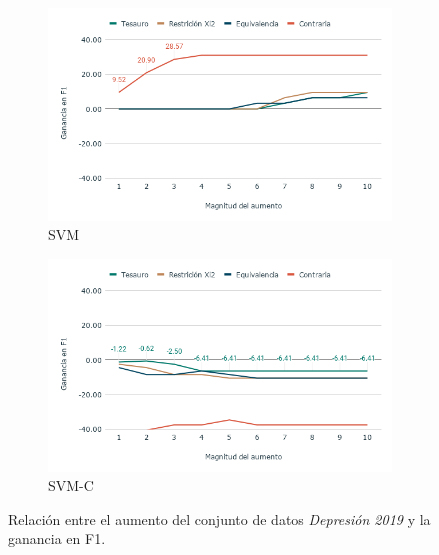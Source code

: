 \begin{figure}[hbt!]
  
    \begin{subfigure}[b]{0.5\textwidth}
        \includegraphics[width=\textwidth]{sections/figures/SVM2019.png}
        \caption{SVM}
    \end{subfigure}
    \hfill
    \begin{subfigure}[b]{0.5\textwidth}
        \includegraphics[width=\textwidth]{sections/figures/SVM-C2019.png}
        \caption{SVM-C}
    \end{subfigure}

   
    \caption{Relación entre el aumento del conjunto de datos \textit{Depresión 2019} y la ganancia en F1.}
    \label{fig:aumento_n_depresion19}
\end{figure}
